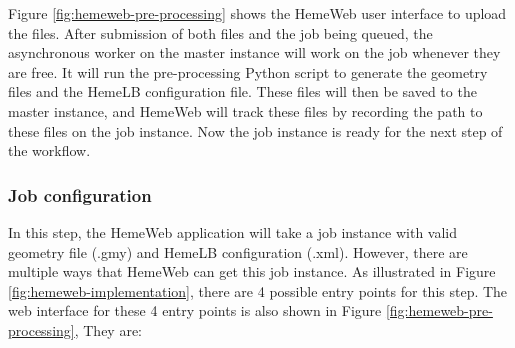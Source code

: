 \vspace{1cm}


Figure \ref{fig:hemeweb-pre-processing} shows the HemeWeb user interface to upload the files.  After submission of both files and the job being queued, the asynchronous worker on the master instance will work on the job whenever they are free. It will run the pre-processing Python script to generate the geometry files and the HemeLB configuration file. These files will then be saved to the master instance, and HemeWeb will track these files by recording the path to these files on the job instance. Now the job instance is ready for the next step of the workflow.

\subsubsection{Job configuration}

In this step, the HemeWeb application will take a job instance with valid geometry file (.gmy) and HemeLB configuration (.xml). However, there are multiple ways that HemeWeb can get this job instance. As illustrated in Figure \ref{fig:hemeweb-implementation}, there are 4 possible entry points for this step. The web interface for these 4 entry points is also shown in Figure \ref{fig:hemeweb-pre-processing}, They are:

